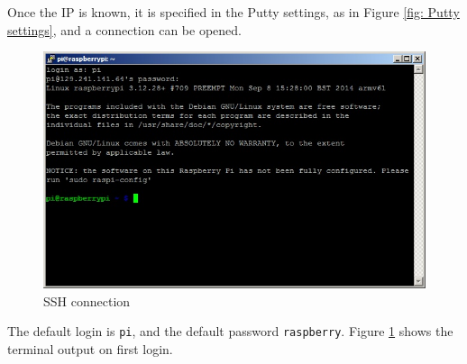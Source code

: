 Once the IP is known, it is specified in the Putty settings, as in Figure \ref{fig: Putty settings}, and a connection can be opened. 
\begin{figure}[htb!]
	\centering \includegraphics[scale=0.45]{fig/Rpi_remote_access2} \caption{SSH connection}
	\label{fig: SSH connection} 
\end{figure}
The default login is \texttt{pi}, and the default password \texttt{raspberry}. Figure \ref{fig: SSH connection} shows the terminal output on first login.
